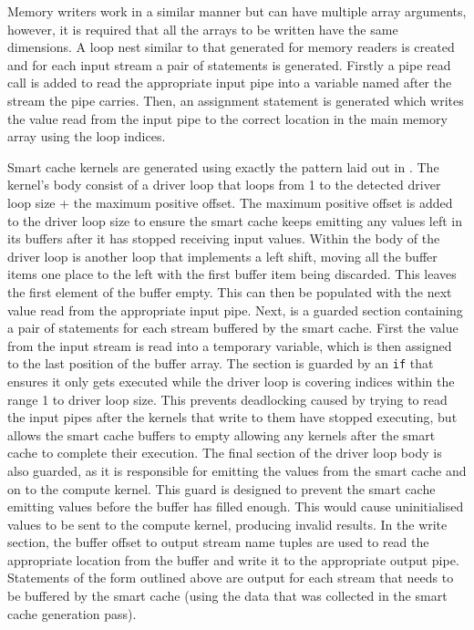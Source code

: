 \documentclass{mpaper}
\begin{document}
Memory writers work in a similar manner but can have multiple array arguments, however, it is required that all the arrays to be written have the same dimensions. 
A loop nest similar to that generated for memory readers is created and for each input stream a pair of statements is generated.
Firstly a pipe read call is added to read the appropriate input pipe into a variable named after the stream the pipe carries.
Then, an assignment statement is generated which writes the value read from the input pipe to the correct location in the main memory array using the loop indices.

Smart cache kernels are generated using exactly the pattern laid out in \cite{VanderbauwhedeNabi2018}.
The kernel's body consist of a driver loop that loops from 1 to the detected driver loop size + the maximum positive offset.
The maximum positive offset is added to the driver loop size to ensure the smart cache keeps emitting any values left in its buffers after it has stopped receiving input values.
Within the body of the driver loop is another loop that implements a left shift, moving all the buffer items one place to the left with the first buffer item being discarded. 
This leaves the first element of the buffer empty.
This can then be populated with the next value read from the appropriate input pipe.
Next, is a guarded section containing a pair of statements for each stream buffered by the smart cache. 
First the value from the input stream is read into a temporary variable, which is then assigned to the last position of the buffer array.
The section is guarded by an \texttt{if} that ensures it only gets executed while the driver loop is covering indices within the range 1 to driver loop size.
This prevents deadlocking caused by trying to read the input pipes after the kernels that write to them have stopped executing, but allows the smart cache buffers to empty allowing any kernels after the smart cache to complete their execution. 
The final section of the driver loop body is also guarded, as it is responsible for emitting the values from the smart cache and on to the compute kernel. 
This guard is designed to prevent the smart cache emitting values before the buffer has filled enough.
This would cause uninitialised values to be sent to the compute kernel, producing invalid results. 
In the write section, the buffer offset to output stream name tuples are used to read the appropriate location from the buffer and write it to the appropriate output pipe.
Statements of the form outlined above are output for each stream that needs to be buffered by the smart cache (using the data that was collected in the smart cache generation pass).
\end{document}
